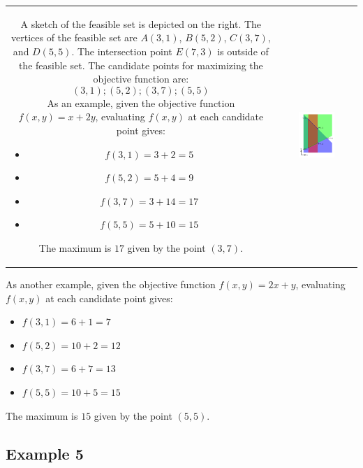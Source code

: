 \documentclass{article}
\begin{document}
\begin{tabular}{cc}
\parbox{0.5\textwidth}{
A sketch of the feasible set is depicted on the right. The vertices of the feasible set are \(A(3,1)\), \(B(5,2)\), \(C(3,7)\), and \(D(5,5)\). The intersection point \(E(7,3)\) is outside of the feasible set. The candidate points for maximizing the objective function are:
\[(3,1); (5,2); (3,7); (5,5)\]
As an example, given the objective function \(f(x,y) = x + 2y\), evaluating \(f(x,y)\) at each candidate point gives:
\begin{itemize}
\item \(f(3, 1) = 3 + 2 = 5\) 
\item \(f(5, 2) = 5 + 4 = 9\) 
\item \(f(3, 7) = 3 + 14 = 17\) 
\item \(f(5, 5) = 5 + 10 = 15\) 
\end{itemize}
The maximum is \(17\) given by the point \((3, 7)\).
} & \parbox{0.5\textwidth}{
\includegraphics[width = 0.5\textwidth]{feasible_set_4}
}
\end{tabular}
As another example, given the objective function \(f(x,y) = 2x + y\), evaluating \(f(x,y)\) at each candidate point gives:
\begin{itemize}
\item \(f(3, 1) = 6 + 1 = 7\) 
\item \(f(5, 2) = 10 + 2 = 12\) 
\item \(f(3, 7) = 6 + 7 = 13\) 
\item \(f(5, 5) = 10 + 5 = 15\) 
\end{itemize}
The maximum is \(15\) given by the point \((5, 5)\).



\subsection*{Example 5}
\end{document}
